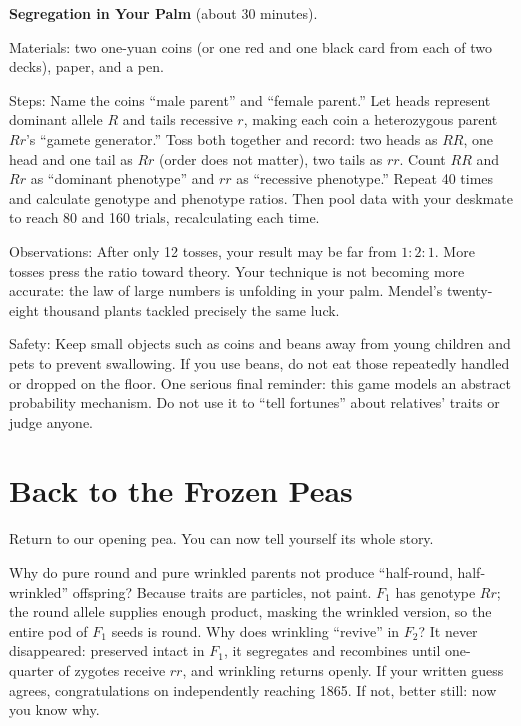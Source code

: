 \begin{shiyan}
\textbf{Segregation in Your Palm} (about 30 minutes).

Materials: two one-yuan coins (or one red and one black card from each of two decks), paper, and a pen.

Steps: Name the coins ``male parent'' and ``female parent.'' Let heads represent dominant allele $R$ and tails recessive $r$, making each coin a heterozygous parent $Rr$'s ``gamete generator.'' Toss both together and record: two heads as $RR$, one head and one tail as $Rr$ (order does not matter), two tails as $rr$. Count $RR$ and $Rr$ as ``dominant phenotype'' and $rr$ as ``recessive phenotype.'' Repeat 40 times and calculate genotype and phenotype ratios. Then pool data with your deskmate to reach 80 and 160 trials, recalculating each time.

Observations: After only 12 tosses, your result may be far from $1:2:1$. More tosses press the ratio toward theory. Your technique is not becoming more accurate: the law of large numbers is unfolding in your palm. Mendel's twenty-eight thousand plants tackled precisely the same luck.

Safety: Keep small objects such as coins and beans away from young children and pets to prevent swallowing. If you use beans, do not eat those repeatedly handled or dropped on the floor. One serious final reminder: this game models an abstract probability mechanism. Do not use it to ``tell fortunes'' about relatives' traits or judge anyone.
\end{shiyan}

\section{Back to the Frozen Peas}

Return to our opening pea. You can now tell yourself its whole story.

Why do pure round and pure wrinkled parents not produce ``half-round, half-wrinkled'' offspring? Because traits are particles, not paint. $F_1$ has genotype $Rr$; the round allele supplies enough product, masking the wrinkled version, so the entire pod of $F_1$ seeds is round. Why does wrinkling ``revive'' in $F_2$? It never disappeared: preserved intact in $F_1$, it segregates and recombines until one-quarter of zygotes receive $rr$, and wrinkling returns openly. If your written guess agrees, congratulations on independently reaching 1865. If not, better still: now you know why.

